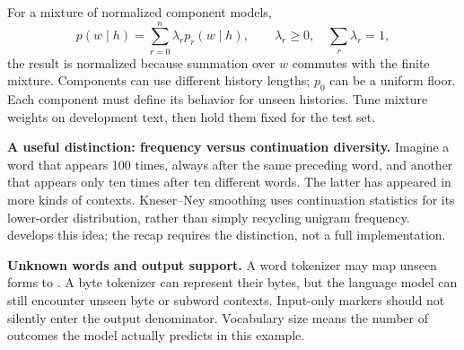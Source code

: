 
For a mixture of normalized component models,
\[
 p(w\mid h)=\sum_{r=0}^{n}\lambda_r p_r(w\mid h),\qquad
 \lambda_r\ge0,\quad\sum_r\lambda_r=1,
\]
the result is normalized because summation over $w$ commutes with the finite
mixture. Components can use different history lengths; $p_0$ can be a
uniform floor. Each component must define its behavior for unseen histories.
Tune mixture weights on development text, then hold them fixed for the test set.

\textbf{A useful distinction: frequency versus continuation diversity.}
Imagine a word that appears 100 times, always after the same preceding
word, and another that appears only ten times after ten different words.
The latter has appeared in more kinds of contexts. Kneser--Ney smoothing
uses continuation statistics for its lower-order distribution, rather than
simply recycling unigram frequency.  develops this idea;
the recap requires the distinction, not a full implementation.

\textbf{Unknown words and output support.} A word tokenizer may map unseen
forms to \UNK{}. A byte tokenizer can represent their bytes, but the language
model can still encounter unseen byte or subword contexts. Input-only
markers should not silently enter the output denominator. Vocabulary size
means the number of outcomes the model actually predicts in this example.

